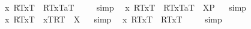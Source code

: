\begin{isabellebody}
{}
%
\endisatagproof
{\isafoldproof}%
%
\isadelimproof
%
\endisadelimproof
\isanewline
{}\isamarkupfalse%
\ {\isachardoublequoteopen}{\isacharbrackleft}{\isasymlparr}\isactrlbold {\isasymlambda}x{\isachardot}\ {\isasymlparr}R\isactrlsup T{\isacharcomma}x\isactrlsup T{\isasymrparr}\ \isactrlbold {\isasymrightarrow}\ {\isasymlparr}R\isactrlsup T{\isacharcomma}x\isactrlsup T{\isasymrparr}{\isacharcomma}a\isactrlsup T{\isasymrparr}{\isacharbrackright}\ {\isacharequal}\ {\isasymtop}{\isachardoublequoteclose}%
\isadelimproof
\ %
\endisadelimproof
%
\isatagproof
{}\isamarkupfalse%
\ simp\ \isamarkupfalse%
%
\endisatagproof
{\isafoldproof}%
%
\isadelimproof
%
\endisadelimproof
\isanewline
\isanewline
{}\isamarkupfalse%
\ {\isachardoublequoteopen}{\isasymlparr}\isactrlbold {\isasymlambda}x{\isachardot}\ {\isasymlparr}R\isactrlsup T{\isacharcomma}x\isactrlsup T{\isasymrparr}\ \isactrlbold {\isasymrightarrow}\ {\isasymlparr}R\isactrlsup T{\isacharcomma}x\isactrlsup T{\isasymrparr}{\isacharcomma}a\isactrlsup T{\isasymrparr}\ {\isacharequal}\ {\isacharparenleft}X\isactrlsup P{\isacharparenright}{\isachardoublequoteclose}%
\isadelimproof
\ %
\endisadelimproof
%
\isatagproof
{}\isamarkupfalse%
\ simp\ \isamarkupfalse%
%
\endisatagproof
{\isafoldproof}%
%
\isadelimproof
%
\endisadelimproof
\isanewline
{}\isamarkupfalse%
\ {\isachardoublequoteopen}{\isacharparenleft}\isactrlbold {\isasymlambda}x{\isachardot}\ {\isasymlparr}R\isactrlsup T{\isacharcomma}x\isactrlsup T{\isasymrparr}\ \isactrlbold {\isasymrightarrow}\ {\isasymlbrace}x\isactrlsup T{\isacharcomma}R\isactrlsup T{\isasymrbrace}{\isacharparenright}\ {\isacharequal}\ X{\isachardoublequoteclose}%
\isadelimproof
\ %
\endisadelimproof
%
\isatagproof
{}\isamarkupfalse%
\ simp\ \isamarkupfalse%
%
\endisatagproof
{\isafoldproof}%
%
\isadelimproof
%
\endisadelimproof
\isanewline
\isanewline
{}\isamarkupfalse%
\ {\isachardoublequoteopen}{\isacharbrackleft}{\isacharparenleft}\isactrlbold {\isasymforall}x{\isachardot}\ {\isasymlparr}R\isactrlsup T{\isacharcomma}x\isactrlsup T{\isasymrparr}\ \isactrlbold {\isasymrightarrow}\ {\isasymlparr}R\isactrlsup T{\isacharcomma}x\isactrlsup T{\isasymrparr}{\isacharparenright}{\isacharbrackright}\ {\isacharequal}\ {\isasymtop}{\isachardoublequoteclose}%
\isadelimproof
\ %
\endisadelimproof
%
\isatagproof
{}\isamarkupfalse%
\ simp\ \isamarkupfalse%

\end{isabellebody}
